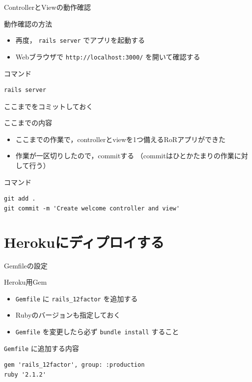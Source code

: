 \documentclass[t, aspectratio=169]{beamer}
\begin{document}
\begin{frame}[fragile,label=sec-6-2-4]{ControllerとViewの動作確認}
 \begin{block}{動作確認の方法}
\begin{itemize}
\item 再度， \texttt{rails server} でアプリを起動する
\item Webブラウザで \texttt{http://localhost:3000/} を開いて確認する
\end{itemize}
\end{block}
\begin{block}{コマンド}
\begin{verbatim}
rails server
\end{verbatim}
\end{block}
\end{frame}

\begin{frame}[fragile,label=sec-6-2-5]{ここまでをコミットしておく}
 \begin{block}{ここまでの内容}
\begin{itemize}
\item ここまでの作業で，controllerとviewを1つ備えるRoRアプリができた
\item 作業が一区切りしたので，commitする
（commitはひとかたまりの作業に対して行う）
\end{itemize}
\end{block}
\begin{block}{コマンド}
\begin{verbatim}
git add .
git commit -m 'Create welcome controller and view'
\end{verbatim}
\end{block}
\end{frame}

\section{Herokuにディプロイする}
\label{sec-6-3}
\begin{frame}[fragile,label=sec-6-3-1]{Gemfileの設定}
 \begin{block}{Heroku用Gem}
\begin{itemize}
\item \texttt{Gemfile} に \texttt{rails\_12factor} を追加する
\item Rubyのバージョンも指定しておく
\item \texttt{Gemfile} を変更したら必ず \texttt{bundle install} すること
\end{itemize}
\end{block}

\begin{block}{\texttt{Gemfile} に追加する内容}
\begin{verbatim}
gem 'rails_12factor', group: :production
ruby '2.1.2'
\end{verbatim}
\end{block}
\end{frame}
\end{document}
